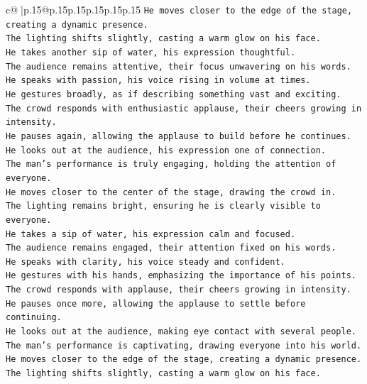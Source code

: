 \documentclass{article}
\begin{document}
{\begin{supertabular}{c@{$\;$}|p{.15\linewidth}@{}p{.15\linewidth}p{.15\linewidth}p{.15\linewidth}p{.15\linewidth}p{.15\linewidth}}
{{{\texttt{He moves closer to the edge of the stage, creating a dynamic presence.  } \\
\texttt{The lighting shifts slightly, casting a warm glow on his face.  } \\
\texttt{He takes another sip of water, his expression thoughtful.  } \\
\texttt{The audience remains attentive, their focus unwavering on his words.  } \\
\texttt{He speaks with passion, his voice rising in volume at times.  } \\
\texttt{He gestures broadly, as if describing something vast and exciting.  } \\
\texttt{The crowd responds with enthusiastic applause, their cheers growing in intensity.  } \\
\texttt{He pauses again, allowing the applause to build before he continues.  } \\
\texttt{He looks out at the audience, his expression one of connection.  } \\
\texttt{The man's performance is truly engaging, holding the attention of everyone.  } \\
\texttt{He moves closer to the center of the stage, drawing the crowd in.  } \\
\texttt{The lighting remains bright, ensuring he is clearly visible to everyone.  } \\
\texttt{He takes a sip of water, his expression calm and focused.  } \\
\texttt{The audience remains engaged, their attention fixed on his words.  } \\
\texttt{He speaks with clarity, his voice steady and confident.  } \\
\texttt{He gestures with his hands, emphasizing the importance of his points.  } \\
\texttt{The crowd responds with applause, their cheers growing in intensity.  } \\
\texttt{He pauses once more, allowing the applause to settle before continuing.  } \\
\texttt{He looks out at the audience, making eye contact with several people.  } \\
\texttt{The man's performance is captivating, drawing everyone into his world.  } \\
\texttt{He moves closer to the edge of the stage, creating a dynamic presence.  } \\
\texttt{The lighting shifts slightly, casting a warm glow on his face.  } \\
}}}
\end{supertabular}}
\end{document}
